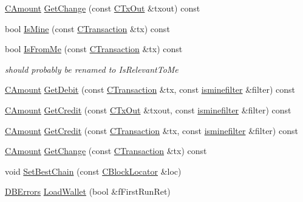 \begin{DoxyCompactItemize}
\item 
\hyperlink{amount_8h_a4eaf3a5239714d8c45b851527f7cb564}{C\+Amount} \hyperlink{class_c_wallet_a9bec62a32e693ed55169ef4a455f3e69}{Get\+Change} (const \hyperlink{class_c_tx_out}{C\+Tx\+Out} \&txout) const 
\item 
bool \hyperlink{class_c_wallet_a181e0a9091e77ce9da97e4cef3266b9f}{Is\+Mine} (const \hyperlink{class_c_transaction}{C\+Transaction} \&tx) const 
\item 
bool \hyperlink{class_c_wallet_a478dd2c26c00ac0d45684f77a936761f}{Is\+From\+Me} (const \hyperlink{class_c_transaction}{C\+Transaction} \&tx) const 
\begin{DoxyCompactList}\small\item\em should probably be renamed to Is\+Relevant\+To\+Me \end{DoxyCompactList}\item 
\hyperlink{amount_8h_a4eaf3a5239714d8c45b851527f7cb564}{C\+Amount} \hyperlink{class_c_wallet_abc7c37fb7922c68460690b6cf653e203}{Get\+Debit} (const \hyperlink{class_c_transaction}{C\+Transaction} \&tx, const \hyperlink{script_8h_aaa5e1639d76aef50f70532acc3302c4b}{isminefilter} \&filter) const 
\item 
\hyperlink{amount_8h_a4eaf3a5239714d8c45b851527f7cb564}{C\+Amount} \hyperlink{class_c_wallet_a9a8ab6f6af8354783f96034e9223e0f2}{Get\+Credit} (const \hyperlink{class_c_tx_out}{C\+Tx\+Out} \&txout, const \hyperlink{script_8h_aaa5e1639d76aef50f70532acc3302c4b}{isminefilter} \&filter) const 
\item 
\hyperlink{amount_8h_a4eaf3a5239714d8c45b851527f7cb564}{C\+Amount} \hyperlink{class_c_wallet_aeffa4ec3b60930bed2bd50ab5e346e75}{Get\+Credit} (const \hyperlink{class_c_transaction}{C\+Transaction} \&tx, const \hyperlink{script_8h_aaa5e1639d76aef50f70532acc3302c4b}{isminefilter} \&filter) const 
\item 
\hyperlink{amount_8h_a4eaf3a5239714d8c45b851527f7cb564}{C\+Amount} \hyperlink{class_c_wallet_a62c0b661d3dc02530de29fc1d1b714c3}{Get\+Change} (const \hyperlink{class_c_transaction}{C\+Transaction} \&tx) const 
\item 
void \hyperlink{class_c_wallet_a1697a92171b4359f49b38aed643cf92b}{Set\+Best\+Chain} (const \hyperlink{class_c_block_locator}{C\+Block\+Locator} \&loc)
\item 
\hyperlink{walletdb_8h_a7558d92e9ea1d446075da1b514c4a944}{D\+B\+Errors} \hyperlink{class_c_wallet_a5d7b244b8ed0cbe24233ee0b6ca3cae0}{Load\+Wallet} (bool \&f\+First\+Run\+Ret)
\item 

\end{DoxyCompactItemize}
